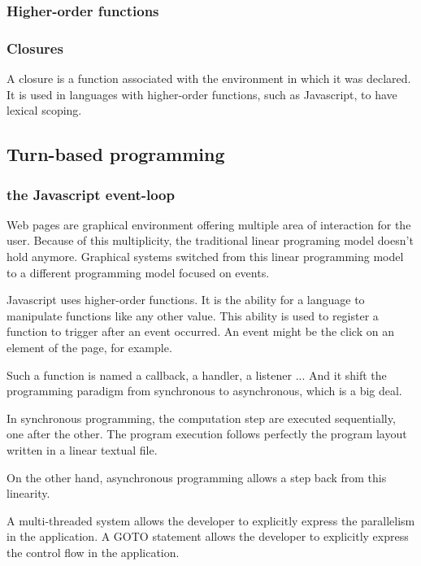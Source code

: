 \subsubsection{Higher-order functions}



\subsubsection{Closures}

A closure is a function associated with the environment in which it was declared.
It is used in languages with higher-order functions, such as Javascript, to have lexical scoping.

\subsection{Turn-based programming}

\subsubsection{the Javascript event-loop}

Web pages are graphical environment offering multiple area of interaction for the user.
Because of this multiplicity, the traditional linear programing model doesn't hold anymore.
Graphical systems switched from this linear programming model to a different programming model focused on events.

Javascript uses higher-order functions.
It is the ability for a language to manipulate functions like any other value.
This ability is used to register a function to trigger after an event occurred.
An event might be the click on an element of the page, for example.

Such a function is named a callback, a handler, a listener ...
And it shift the programming paradigm from synchronous to asynchronous, which is a big deal.

In synchronous programming, the computation step are executed sequentially, one after the other.
The program execution follows perfectly the program layout written in a linear textual file.

On the other hand, asynchronous programming allows a step back from this linearity.


A multi-threaded system allows the developer to explicitly express the parallelism in the application.
A GOTO statement allows the developer to explicitly express the control flow in the application.


